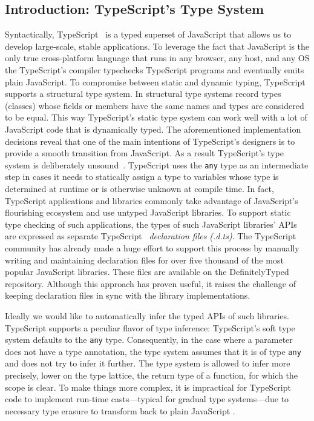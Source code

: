 \documentclass[sigplan,10pt,review,anonymous]{acmart}
\theoremstyle{plain}
\theoremstyle{remark}
\theoremstyle{definition}
\begin{document}
\subsection{Introduction: TypeScript's Type System}\label{ssec:intro-typescript}
Syntactically, TypeScript~\citep{typescript} is a typed superset of
JavaScript that allows us to develop large-scale, stable applications.
To leverage the fact that JavaScript is the only true cross-platform
language that runs in any browser, any host, and any OS the TypeScript's
compiler typechecks TypeScript programs and eventually emits plain JavaScript.
To compromise between static and dynamic typing, TypeScript supports a
structural type system. In structural type systems record types (classes) whose fields or members have the same names and types are considered to be equal. This way TypeScript's static type system can work well with a lot of JavaScript code that is dynamically typed. The aforementioned implementation decisions
reveal that one of the main intentions of TypeScript's designers is to
provide a smooth transition from JavaScript. As a result TypeScript's type
system is deliberately unsound~\citep{understandtypescript}. TypeScript uses the
\texttt{any} type as an intermediate
step in cases it needs to statically assign a type to variables whose type is determined at runtime or is otherwise unknown at compile time. 
In fact, TypeScript applications and libraries commonly take advantage of JavaScript's flourishing ecosystem and use untyped JavaScript
libraries. To support static type checking of such applications, the types of such JavaScript libraries' APIs are expressed as separate TypeScript
~\emph{declaration files} \textit{(.d.ts)}. The TypeScript community has already
made a huge effort to support this process by manually writing and maintaining
declaration files for over five thousand of the most popular JavaScript
libraries. These files are available on the DefinitelyTyped
\citep{definitelytyped} repository. Although this approach has proven
useful, it raises the challenge of keeping declaration files
in sync with the library implementations.

Ideally we would like to automatically infer the typed APIs of such
libraries. TypeScript supports a peculiar flavor of type inference: TypeScript's soft type system \citep{softtyping} 
defaults to the \texttt{any} type. Consequently, in the case where a parameter does not
have a type annotation, the type system assumes that it is of type
\texttt{any} and does not try to infer it further. The type system is allowed to infer
more precisely, lower on the type lattice, the return type of a function, for
which the scope is clear. To make things more complex, it is impractical for
TypeScript code to implement run-time casts---typical for gradual type
systems---due to necessary type erasure to transform back to plain
JavaScript \citep{understandtypescript}.
\end{document}
